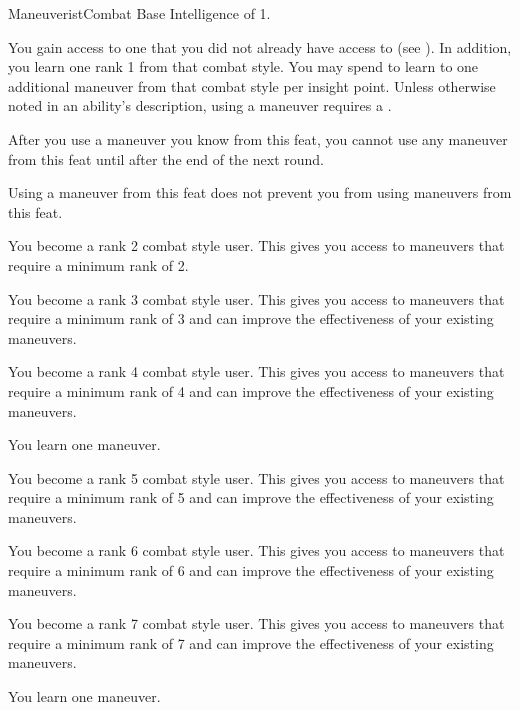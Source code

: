     \begin{feat}{Maneuverist}{Combat}
        \featpre Base Intelligence of 1.

         You gain access to one  that you did not already have access to (see ).
        In addition, you learn one rank 1  from that combat style.
        You may spend  to learn to one additional maneuver from that combat style per insight point.
        Unless otherwise noted in an ability's description, using a maneuver requires a .

        After you use a maneuver you know from this feat, you cannot use any maneuver from this feat until after the end of the next round.

         Using a maneuver from this feat does not prevent you from using maneuvers from this feat.

         You become a rank 2 combat style user.
        This gives you access to maneuvers that require a minimum rank of 2.

         You become a rank 3 combat style user.
        This gives you access to maneuvers that require a minimum rank of 3 and can improve the effectiveness of your existing maneuvers.

         You become a rank 4 combat style user.
        This gives you access to maneuvers that require a minimum rank of 4 and can improve the effectiveness of your existing maneuvers.

         You learn one maneuver.

         You become a rank 5 combat style user.
        This gives you access to maneuvers that require a minimum rank of 5 and can improve the effectiveness of your existing maneuvers.

         You become a rank 6 combat style user.
        This gives you access to maneuvers that require a minimum rank of 6 and can improve the effectiveness of your existing maneuvers.

         You become a rank 7 combat style user.
        This gives you access to maneuvers that require a minimum rank of 7 and can improve the effectiveness of your existing maneuvers.

         You learn one maneuver.
    \end{feat}


